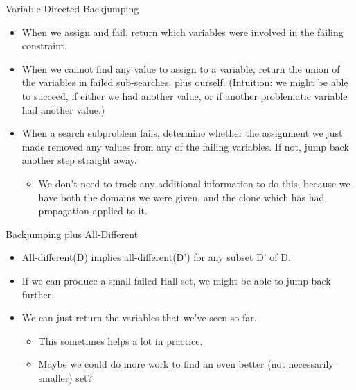 \documentclass{beamer}
\begin{document}
\begin{frame}{Variable-Directed Backjumping}
    \begin{itemize}
        \item When we assign and fail, return which variables were involved in the failing
            constraint.

        \item When we cannot find any value to assign to a variable, return the union of the
            variables in failed sub-searches, plus ourself. (Intuition: we might be able to
            succeed, if either we had another value, or if another problematic variable had
            another value.)

        \item When a search subproblem fails, determine whether the assignment we just made
            removed any values from any of the failing variables. If not, jump back another step
            straight away.

            \begin{itemize}
                \item We don't need to track any additional information to do this, because we
                    have both the domains we were given, and the clone which has had propagation
                    applied to it.
            \end{itemize}
    \end{itemize}
\end{frame}

\begin{frame}{Backjumping plus All-Different}
    \begin{itemize}
        \item All-different(D) implies all-different(D') for any subset D' of D.

        \item If we can produce a small failed Hall set, we might be able to jump back further.

        \item We can just return the variables that we've seen so far.
            \begin{itemize}
                \item This sometimes helps a lot in practice.
                \item Maybe we could do more work to find an even better (not necessarily
                    smaller) set?
            \end{itemize}
    \end{itemize}
\end{frame}
\end{document}

